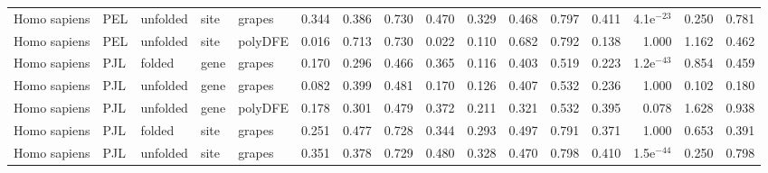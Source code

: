 \begin{longtable}{lllllrrrrrrrrrrr}
        Homo sapiens &                       PEL &  unfolded &  site &   grapes &                              0.344 &                               0.386 &                 0.730 &                 0.470 &                              0.329 &                               0.468 &                 0.797 &                 0.411 &  4.1e$^{-23}$ &  0.250 &  0.781 \\
        Homo sapiens &                       PEL &  unfolded &  site &  polyDFE &                              0.016 &                               0.713 &                 0.730 &                 0.022 &                              0.110 &                               0.682 &                 0.792 &                 0.138 &         1.000 &  1.162 &  0.462 \\
        Homo sapiens &                       PJL &    folded &  gene &   grapes &                              0.170 &                               0.296 &                 0.466 &                 0.365 &                              0.116 &                               0.403 &                 0.519 &                 0.223 &  1.2e$^{-43}$ &  0.854 &  0.459 \\
        Homo sapiens &                       PJL &  unfolded &  gene &   grapes &                              0.082 &                               0.399 &                 0.481 &                 0.170 &                              0.126 &                               0.407 &                 0.532 &                 0.236 &         1.000 &  0.102 &  0.180 \\
        Homo sapiens &                       PJL &  unfolded &  gene &  polyDFE &                              0.178 &                               0.301 &                 0.479 &                 0.372 &                              0.211 &                               0.321 &                 0.532 &                 0.395 &         0.078 &  1.628 &  0.938 \\
        Homo sapiens &                       PJL &    folded &  site &   grapes &                              0.251 &                               0.477 &                 0.728 &                 0.344 &                              0.293 &                               0.497 &                 0.791 &                 0.371 &         1.000 &  0.653 &  0.391 \\
        Homo sapiens &                       PJL &  unfolded &  site &   grapes &                              0.351 &                               0.378 &                 0.729 &                 0.480 &                              0.328 &                               0.470 &                 0.798 &                 0.410 &  1.5e$^{-44}$ &  0.250 &  0.798 \\

\end{longtable}
